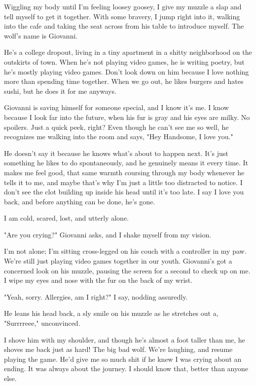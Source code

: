 Wiggling my body until I'm feeling loosey goosey, I give my muzzle a slap and tell myself to get it together. With some bravery, I jump right into it, walking into the cafe and taking the seat across from his table to introduce myself. The wolf's name is Giovanni.

He's a college dropout, living in a tiny apartment in a shitty neighborhood on the outskirts of town. When he's not playing video games, he is writing poetry, but he's mostly playing video games. Don't look down on him because I love nothing more than spending time together. When we go out, he likes burgers and hates sushi, but he does it for me anyways.

Giovanni is saving himself for someone special, and I know it's me. I know because I look far into the future, when his fur is gray and his eyes are milky. No spoilers. Just a quick peek, right? Even though he can't see me so well, he recognizes me walking into the room and says, "Hey Handsome, I love you."

He doesn't say it because he knows what's about to happen next. It's just something he likes to do spontaneously, and he genuinely means it every time. It makes me feel good, that same warmth coursing through my body whenever he tells it to me, and maybe that's why I'm just a little too distracted to notice. I don't see the clot building up inside his head until it's too late. I say I love you back, and before anything can be done, he's gone.

I am cold, scared, lost, and utterly alone.

"Are you crying?" Giovanni asks, and I shake myself from my vision.

I'm not alone; I'm sitting cross-legged on his couch with a controller in my paw. We're still just playing video games together in our youth. Giovanni's got a concerned look on his muzzle, pausing the screen for a second to check up on me. I wipe my eyes and nose with the fur on the back of my wrist.

"Yeah, sorry. Allergies, am I right?" I say, nodding assuredly.

He leans his head back, a sly smile on his muzzle as he stretches out a, "Surrrreee," unconvinced.

I shove him with my shoulder, and though he's almost a foot taller than me, he shoves me back just as hard! The big bad wolf. We're laughing, and resume playing the game. He'd give me so much shit if he knew I was crying about an ending. It was always about the journey. I should know that, better than anyone else.

